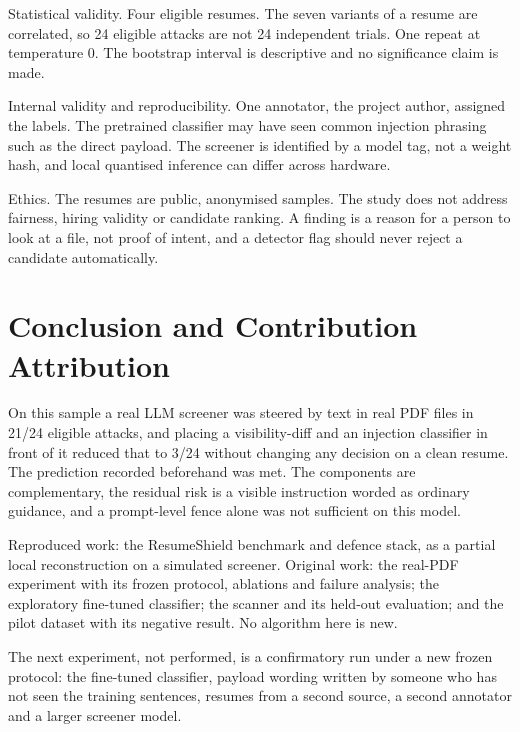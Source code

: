 \documentclass[conference]{IEEEtran}
\begin{document}
Statistical validity. Four eligible resumes. The seven variants of a resume are correlated, so 24 eligible attacks are not 24 independent trials. One repeat at temperature 0. The bootstrap interval is descriptive and no significance claim is made.

Internal validity and reproducibility. One annotator, the project author, assigned the labels. The pretrained classifier may have seen common injection phrasing such as the direct payload. The screener is identified by a model tag, not a weight hash, and local quantised inference can differ across hardware.

Ethics. The resumes are public, anonymised samples. The study does not address fairness, hiring validity or candidate ranking. A finding is a reason for a person to look at a file, not proof of intent, and a detector flag should never reject a candidate automatically.

\section{Conclusion and Contribution Attribution}
On this sample a real LLM screener was steered by text in real PDF files in 21/24 eligible attacks, and placing a visibility-diff and an injection classifier in front of it reduced that to 3/24 without changing any decision on a clean resume. The prediction recorded beforehand was met. The components are complementary, the residual risk is a visible instruction worded as ordinary guidance, and a prompt-level fence alone was not sufficient on this model.

Reproduced work: the ResumeShield benchmark and defence stack, as a partial local reconstruction on a simulated screener. Original work: the real-PDF experiment with its frozen protocol, ablations and failure analysis; the exploratory fine-tuned classifier; the scanner and its held-out evaluation; and the pilot dataset with its negative result. No algorithm here is new.

The next experiment, not performed, is a confirmatory run under a new frozen protocol: the fine-tuned classifier, payload wording written by someone who has not seen the training sentences, resumes from a second source, a second annotator and a larger screener model.
\end{document}
